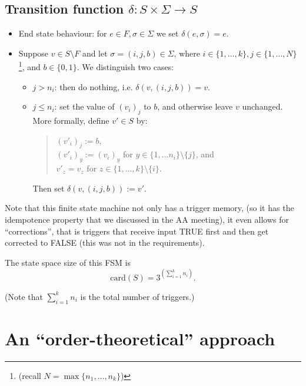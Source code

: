 \documentclass[12pt]{amsart}
\begin{document}
\subsection{Transition function $\delta: S\times \Sigma \to S$}
\begin{itemize}
    \item End state behaviour: for $e\in F, \sigma\in \Sigma$ we set
        $\delta(e,\sigma) = e$.
    \item Suppose $v\in S \setminus F$ and let $\sigma = (i, j, b)\in \Sigma$, 
        where $i\in \{1,\ldots, k\}, j\in \{1,\ldots, N\}$
        \footnote{(recall $N = \max\{n_1,\ldots, n_k\}$)}, and $b\in \{0,1\}$. 
        We distinguish two cases:

        \begin{itemize}
            \item $j > n_i$: then do nothing, i.e. $\delta(v, (i,j,b)) = v$.
            \item $j \leq n_i$: set the value of $(v_i)_j$ to $b$, and otherwise
                leave $v$ unchanged. More formally, 
                define $v'\in S$ by:
                \begin{quote}
                $(v'_i)_j := b$, \\ 
                $(v'_i)_y := (v_i)_y$ for  $y \in \{1,\ldots n_i\} \setminus \{j\}$, and \\
                $v'_z = v_z$  for $z \in \{1,\ldots,k\}\setminus \{i\}.$
                \end{quote}

                \vspace*{2mm}

                Then set $\delta(v, (i,j,b)) := v'$.
        \end{itemize}
\end{itemize}

Note that this finite state machine not only has a trigger memory,
(so it has the idempotence property that we discussed in the AA 
meeting), it even allows for ``corrections'', that is
triggers that receive input TRUE first and then get
corrected to FALSE (this was not in the requirements). 

The state space size of this FSM is $$\text{card}(S) = 3^{(\sum_{i=1}^k n_i)}.$$

(Note that $\sum_{i=1}^k n_i$ is the total number of triggers.)

\section{An ``order-theoretical'' approach}
\end{document}
